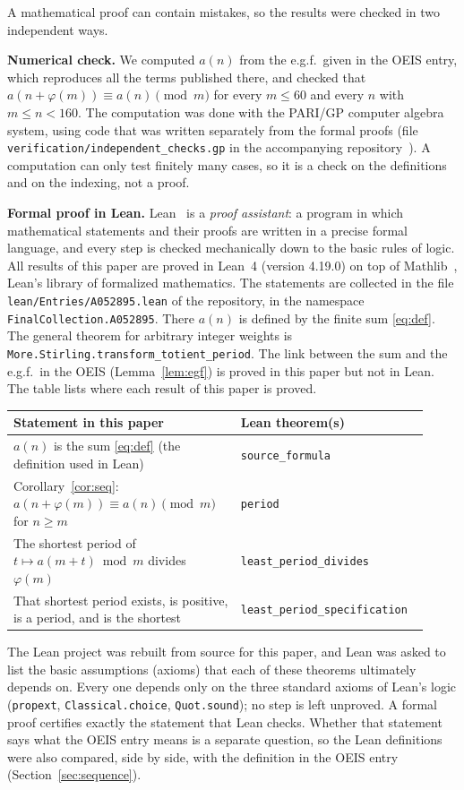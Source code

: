 \documentclass[11pt,a4paper]{article}
\theoremstyle{definition}
\theoremstyle{remark}
\newcommand{\para}[1]{\par\medskip\noindent\textbf{#1}\enspace}
\begin{document}
A mathematical proof can contain mistakes, so the results were checked in two independent ways.

\para{Numerical check.}
We computed $a(n)$ from the e.g.f.\ given in the OEIS entry, which reproduces all the terms published there, and
checked that $a(n+\varphi(m))\equiv a(n)\pmod m$ for every $m\le60$ and every $n$ with $m\le n<160$.
The computation was done with the PARI/GP computer algebra system, using code that was written separately from the
formal proofs (file \texttt{verification/independent\_checks.gp} in the accompanying repository~\cite{repo}).
A computation can only test finitely many cases, so it is a check on the definitions and on the indexing, not a proof.

\para{Formal proof in Lean.}
Lean~\cite{lean} is a \emph{proof assistant}: a program in which mathematical statements and their proofs are written
in a precise formal language, and every step is checked mechanically down to the basic rules of logic. All results of
this paper are proved in Lean~4 (version 4.19.0) on top of Mathlib~\cite{mathlib}, Lean's library of formalized
mathematics. The statements are collected in the file \texttt{lean/Entries/A052895.lean} of the repository,
in the namespace \texttt{FinalCollection.A052895}. There $a(n)$ is defined by the finite sum \eqref{eq:def}. The general theorem for arbitrary integer weights is \texttt{More.Stirling.transform\_totient\_period}. The link between the sum and the e.g.f.\ in the OEIS (Lemma~\ref{lem:egf}) is proved in this paper but not in Lean.
The table lists where each result of this paper is proved.
\begin{center}\small\renewcommand{\arraystretch}{1.25}
\begin{tabular}{>{\raggedright\arraybackslash}p{0.52\linewidth}>{\raggedright\arraybackslash}p{0.4\linewidth}}
\toprule
Statement in this paper & Lean theorem(s)\\
\midrule
$a(n)$ is the sum \eqref{eq:def} (the definition used in Lean) & \texttt{source\_\allowbreak{}formula} \\
Corollary~\ref{cor:seq}: $a(n+\varphi(m))\equiv a(n)\pmod m$ for $n\ge m$ & \texttt{period} \\
The shortest period of $t\mapsto a(m+t)\bmod m$ divides $\varphi(m)$ & \texttt{least\_\allowbreak{}period\_\allowbreak{}divides} \\
That shortest period exists, is positive, is a period, and is the shortest & \texttt{least\_\allowbreak{}period\_\allowbreak{}specification} \\
\bottomrule
\end{tabular}
\end{center}
The Lean project was rebuilt from source for this paper, and Lean was asked to list the basic assumptions (axioms)
that each of these theorems ultimately depends on. Every one depends only on the three standard axioms of Lean's logic
(\texttt{propext}, \texttt{Classical.choice}, \texttt{Quot.sound}); no step is left unproved. A formal proof certifies
exactly the statement that Lean checks. Whether that statement says what the OEIS entry means is a separate question,
so the Lean definitions were also compared, side by side, with the definition in the OEIS entry
(Section~\ref{sec:sequence}).
\end{document}

